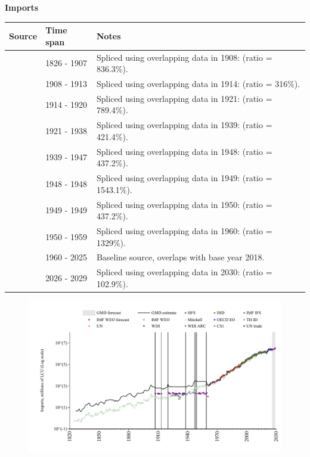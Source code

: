 \documentclass[12pt,a4paper,landscape]{article}
\begin{document}
\begin{adjustbox}{max totalsize={\paperwidth}{\paperheight},center}
\begin{minipage}[t][\textheight][t]{\textwidth}
\vspace*{0.5cm}
{}
\begin{center}
{\Large\bfseries Imports}
\end{center}
\vspace{0.5cm}
\begin{table}[H]
\centering
\small
\begin{tabular}{|l|l|l|}
\hline
\textbf{Source} & \textbf{Time span} & \textbf{Notes} \\
\hline
\rowcolor{white}\cite{Mitchell}& 1826 - 1907 &Spliced using overlapping data in 1908: (ratio = 836.3\%). \\
\rowcolor{lightgray}\cite{UN_trade}& 1908 - 1913 &Spliced using overlapping data in 1914: (ratio = 316\%). \\
\rowcolor{white}\cite{Mitchell}& 1914 - 1920 &Spliced using overlapping data in 1921: (ratio = 789.4\%). \\
\rowcolor{lightgray}\cite{UN_trade}& 1921 - 1938 &Spliced using overlapping data in 1939: (ratio = 421.4\%). \\
\rowcolor{white}\cite{Mitchell}& 1939 - 1947 &Spliced using overlapping data in 1948: (ratio = 437.2\%). \\
\rowcolor{lightgray}\cite{UN_trade}& 1948 - 1948 &Spliced using overlapping data in 1949: (ratio = 1543.1\%). \\
\rowcolor{white}\cite{Mitchell}& 1949 - 1949 &Spliced using overlapping data in 1950: (ratio = 437.2\%). \\
\rowcolor{lightgray}\cite{UN_trade}& 1950 - 1959 &Spliced using overlapping data in 1960: (ratio = 1329\%). \\
\rowcolor{white}\cite{OECD_EO}& 1960 - 2025 &Baseline source, overlaps with base year 2018. \\
\rowcolor{lightgray}\cite{IMF_WEO_forecast}& 2026 - 2029 &Spliced using overlapping data in 2030: (ratio = 102.9\%). \\
\hline
\end{tabular}
\end{table}
\begin{figure}[H]
\centering
\includegraphics[width=\textwidth,height=0.6\textheight,keepaspectratio]{graphs/ZAF_imports.pdf}

\end{figure}
\end{minipage}
\end{adjustbox}
\end{document}
